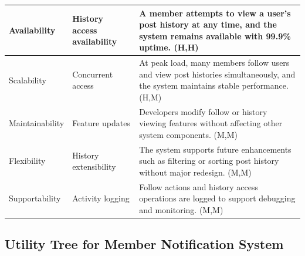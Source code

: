 \documentclass{article}
\begin{document}
\begin{table}[H]
\begin{tabular}{|p{3cm}|p{4cm}|p{7cm}|}
        Availability
                                   & History access availability
                                   & A member attempts to view a user's post history at any time, and the system remains available with 99.9\% uptime. (H,H)                               \\
        \hline

        Scalability
                                   & Concurrent access
                                   & At peak load, many members follow users and view post histories simultaneously, and the system maintains stable performance. (H,M)                    \\
        \hline

        Maintainability
                                   & Feature updates
                                   & Developers modify follow or history viewing features without affecting other system components. (M,M)                                                 \\
        \hline

        Flexibility
                                   & History extensibility
                                   & The system supports future enhancements such as filtering or sorting post history without major redesign. (M,M)                                       \\
        \hline

        Supportability
                                   & Activity logging
                                   & Follow actions and history access operations are logged to support debugging and monitoring. (M,M)                                                    \\
        \hline
    \end{tabular}
\end{table}

\subsection{Utility Tree for Member Notification System}
\end{document}
